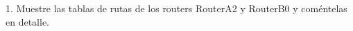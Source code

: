 \begin{ejer}
1. Muestre las tablas de rutas de los routers RouterA2 y RouterB0 y coméntelas en detalle.
\end{ejer}